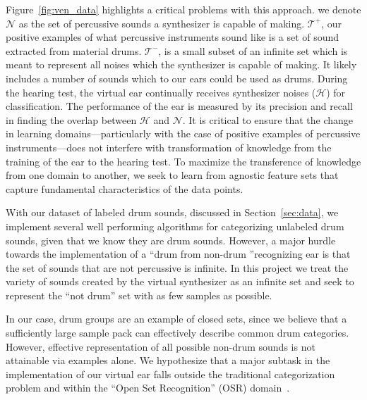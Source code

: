 \documentclass[\main/thesis.tex]{subfiles}
\begin{document}
Figure~\ref{fig:ven_data} highlights a critical problems with this approach. we denote $\mathcal{N}$ as the set of percussive sounds a synthesizer is capable of making. $\mathcal{T^{+}}$, our positive examples of what percussive instruments sound like is a set of sound extracted from material drums. $\mathcal{T^{-}}$, is a small subset of an infinite set which is meant to represent all noises which the synthesizer is capable of making. It likely includes a number of sounds which to our ears could be used as drums. During the hearing test, the virtual ear continually receives synthesizer noises ($\mathcal{H}$) for classification. The performance of the ear is measured by its precision and recall in finding the overlap between $\mathcal{H}$ and $\mathcal{N}$. It is critical to ensure that the change in learning domains---particularly with the case of positive examples of percussive instruments---does not interfere with transformation of knowledge from the training of the ear to the hearing test. To maximize the transference of knowledge from one domain to another, we seek to learn from agnostic feature sets that capture fundamental characteristics of the data points. 

 With our dataset of labeled drum sounds, discussed in Section~\ref{sec:data}, we implement several well performing algorithms for categorizing unlabeled drum sounds, given that we know they are drum sounds. However, a major hurdle towards the implementation of a \textquotedblleft drum from non-drum \textquotedblright recognizing ear is that the set of sounds that are not percussive is infinite. In this project we treat the variety of sounds created by the virtual synthesizer as an infinite set and seek to represent the \enquote{not drum} set with as few samples as possible.

 
In our case, drum groups are an example of closed sets, since we believe that a sufficiently large sample pack can effectively describe common drum categories. However, effective representation of all possible non-drum sounds is not attainable via examples alone. We hypothesize that a major subtask in the implementation of our virtual ear falls outside the traditional categorization problem and within the \enquote{Open Set Recognition} (OSR) domain~\cite{geng2020recent,mundt2019open}. 
\end{document}
